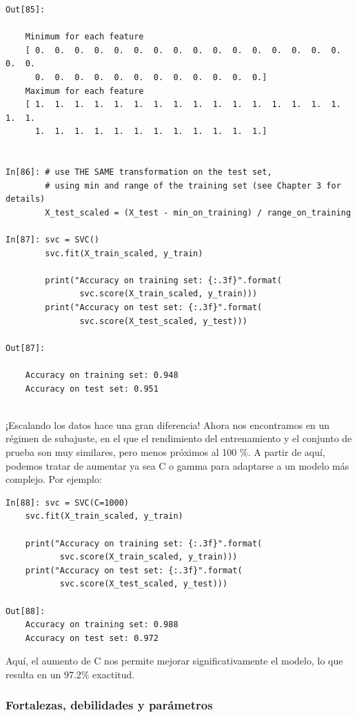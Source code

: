 {\begin{lstlisting}
Out[85]:

    Minimum for each feature
    [ 0.  0.  0.  0.  0.  0.  0.  0.  0.  0.  0.  0.  0.  0.  0.  0.  0.  0.
      0.  0.  0.  0.  0.  0.  0.  0.  0.  0.  0.  0.]
    Maximum for each feature
    [ 1.  1.  1.  1.  1.  1.  1.  1.  1.  1.  1.  1.  1.  1.  1.  1.  1.  1.
      1.  1.  1.  1.  1.  1.  1.  1.  1.  1.  1.  1.]


In[86]: # use THE SAME transformation on the test set,
        # using min and range of the training set (see Chapter 3 for details)
        X_test_scaled = (X_test - min_on_training) / range_on_training
   
In[87]: svc = SVC()
        svc.fit(X_train_scaled, y_train)
   
        print("Accuracy on training set: {:.3f}".format(
               svc.score(X_train_scaled, y_train)))
        print("Accuracy on test set: {:.3f}".format(
               svc.score(X_test_scaled, y_test)))
   
Out[87]:
  
    Accuracy on training set: 0.948
    Accuracy on test set: 0.951


\end{lstlisting}



¡Escalando los datos hace una gran diferencia! Ahora nos encontramos en un régimen de subajuste, 
en el que el rendimiento del entrenamiento y el conjunto de prueba son muy similares, pero menos próximos al 100 \%. A partir de aquí, podemos tratar de aumentar ya sea C o gamma para adaptarse a un modelo más complejo. Por ejemplo:\\


\begin{lstlisting}
In[88]: svc = SVC(C=1000)
	svc.fit(X_train_scaled, y_train)
	
	print("Accuracy on training set: {:.3f}".format(
	       svc.score(X_train_scaled, y_train)))
	print("Accuracy on test set: {:.3f}".format(
	       svc.score(X_test_scaled, y_test)))

Out[88]:
	Accuracy on training set: 0.988
	Accuracy on test set: 0.972
\end{lstlisting}


\noindent Aquí, el aumento de C nos permite mejorar significativamente el modelo, lo que resulta en un 97.2\%
exactitud.


\subsubsection{Fortalezas, debilidades y parámetros}

}
